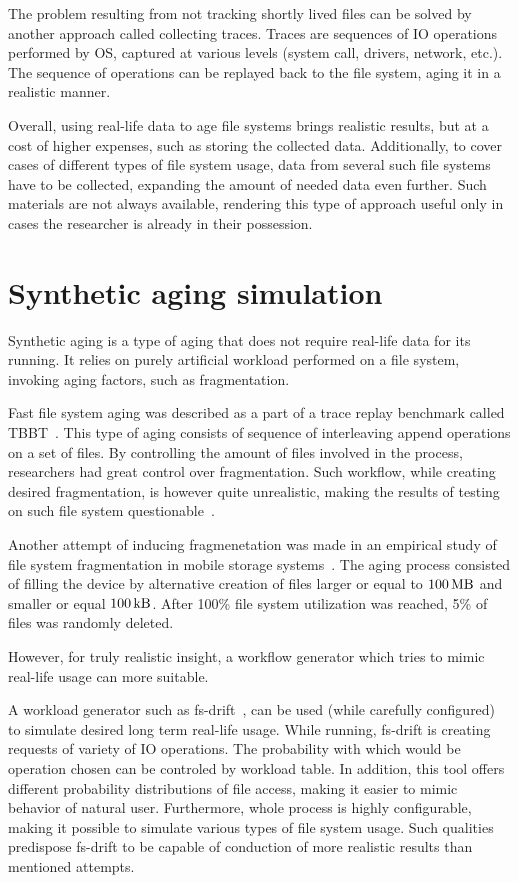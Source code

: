 \documentclass[
  color, %
  table, %
  lof,   %
  lot,   %
]{fithesis3}
\begin{document}
The problem resulting from not tracking shortly lived files can be solved by another approach called collecting traces. Traces are sequences of IO operations performed by OS, captured at various levels (system call, drivers, network, etc.). The sequence of operations can be replayed back to the file system, aging it in a realistic manner.

Overall, using real-life data to age file systems brings realistic results, but at a cost of higher expenses, such as storing the collected data. Additionally, to cover cases of different types of file system usage, data from several such file systems have to be collected, expanding the amount of needed data even further. Such materials are not always available, rendering this type of approach useful only in cases the researcher is already in their possession.

\section{Synthetic aging simulation}
Synthetic aging is a type of aging that does not require real-life data for its running. It relies on purely artificial workload performed on a file system, invoking aging factors, such as fragmentation.

Fast file system aging was described as a part of a trace replay benchmark called TBBT~\cite{Zhu:2005:TSA:1251028.1251052}. This type of aging consists of sequence of interleaving append operations on a set of files. By controlling the amount of files involved in the process, researchers had great control over fragmentation. Such workflow, while creating desired fragmentation, is however quite unrealistic, making the results of testing on such file system questionable~\cite{Traeger:2008:NYS:1367829.1367831}.

Another attempt of inducing fragmenetation was made in an empirical study of file system fragmentation in mobile storage systems~\cite{ji2016empirical}. The aging process consisted of filling the device by alternative creation of files larger or equal to $\SI{100}{\mega\byte}$ and smaller or equal $\SI{100}{\kilo\byte}$. After 100\% file system utilization was reached, 5\% of files was randomly deleted. 

However, for truly realistic insight, a workflow generator which tries to mimic real-life usage can more suitable.

A workload generator such as fs-drift~\cite{fs-drift:github}, can be used (while carefully configured) to simulate desired long term real-life usage. While running, fs-drift is creating requests of variety of IO operations. The probability with which would be operation chosen can be controled by workload table. In addition, this tool offers different probability distributions of file access, making it easier to mimic behavior of natural user. Furthermore, whole process is highly configurable, making it possible to simulate various types of file system usage. Such qualities predispose fs-drift to be capable of conduction of more realistic results than mentioned attempts.
\end{document}
